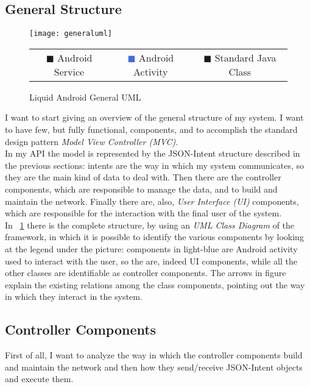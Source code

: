 \subsection{General Structure}
\begin{figure}[h]
	\centering
	\texttt{[image: generaluml]}
	\caption{Liquid Android General UML}
	\label{fig:4.7}
	\begin{tabular}{ccc}
		\textcolor{OliveGreen}{$\blacksquare$} Android Service & \textcolor{RoyalBlue}{$\blacksquare$} Android Activity & \textcolor{RoyalPurple}{$\blacksquare$} Standard Java Class\\
	\end{tabular}
\end{figure}
I want to start giving an overview of the general structure of my system. I want to have few, but fully functional, components, and to accomplish the standard design pattern \textit{Model View Controller (MVC)}.\\
In my API the model is represented by the JSON-Intent structure described in the previous sections: intents are the way in which my system communicates, so they are the main kind of data to deal with. Then there are the controller components, which are responsible to manage the data, and to build and maintain the network. Finally there are, also, \textit{User Interface (UI)} components, which are responsible for the interaction with the final user of the system.\\
In \figurename~\ref{fig:4.7} there is the complete structure, by using an \textit{UML Class Diagram} of the framework, in which it is possible to identify the various components by looking at the legend under the picture: components in light-blue are Android activity used to interact with the user, so the are, indeed UI components, while all the other classes are identifiable as controller components. The arrows in figure explain the existing relations among the class components, pointing out the way in which they interact in the system.
\subsection{Controller Components}
First of all, I want to analyze the way in which the controller components build and maintain the network and then how they send/receive JSON-Intent objects and execute them.\\
